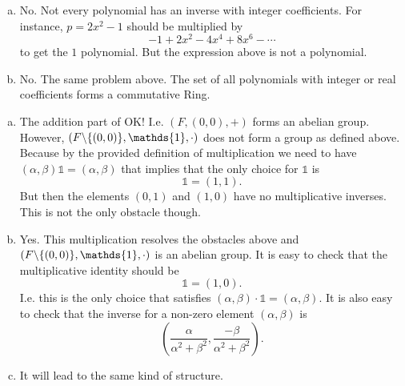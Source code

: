 \begin{problem}
	\begin{solution}
		\begin{enumerate}[(a)]
			\item No. Not every polynomial has an inverse with integer coefficients. For instance, $ p= 2x^2 -1 $ should be multiplied by
			\[ -1 + 2x^2 - 4x^4 + 8x^6 - \cdots \]
			to get the $ 1 $ polynomial. But the expression above is not a polynomial.
			\item No. The same problem above. The set of all polynomials with integer or real coefficients forms a commutative Ring. 
		\end{enumerate}
	\end{solution}
\end{problem}

\begin{problem}
	\begin{solution}
		\begin{enumerate}[(a)]
			\item The addition part of OK! I.e. $ (F,(0,0),+) $ forms an abelian group. However, $ (F\backslash\set{(0,0)},\mathds{1},\cdot) $ does not form a group as defined above. Because by the provided definition of multiplication we need to have $ (\alpha,\beta)\mathds{1} = (\alpha,\beta) $ that implies that the only choice for $ \mathds{1} $ is
			\[ \mathds{1} = (1,1). \]
			But then the elements $ (0,1) $ and $ (1,0) $ have no multiplicative inverses. This is not the only obstacle though.
			
			\item Yes. This multiplication resolves the obstacles above and $ (F\backslash\set{(0,0)},\mathds{1},\cdot) $ is an abelian group. It is easy to check that the multiplicative identity should be
			\[ \mathds{1} = (1,0). \]
			I.e. this is the only choice that satisfies $ (\alpha,\beta)\cdot \mathds{1} = (\alpha,\beta) $. It is also easy to check that the inverse for a non-zero element $ (\alpha,\beta) $ is
			\[ (\frac{\alpha}{\alpha^2 + \beta^2}, \frac{-\beta}{\alpha^2 + \beta^2}). \]
			
			\item It will lead to the same kind of structure. 
		\end{enumerate}
	\end{solution}
\end{problem}


